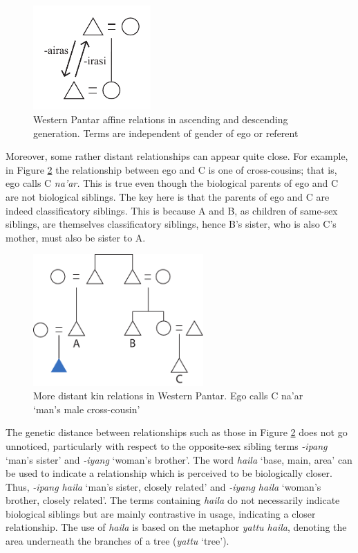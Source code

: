 \begin{figure}[h]
\centering
\includegraphics[width=4.5cm]{figures/Holton_ch5_fig3.pdf}
\caption{ Western Pantar affine relations in ascending and descending generation. Terms are independent of gender of ego or referent}
\label{fig:5:3}
\end{figure}  

Moreover, some rather distant relationships can appear quite close. For example, in Figure \ref{fig:5:4} the relationship between ego and C is one of cross-cousins; that is, ego calls C \textit{na'ar.} This is true even though the biological parents of ego and C are not biological siblings. The key here is that the parents of ego and C are indeed classificatory siblings. This is because A and B, as children of same-sex siblings, are themselves classificatory siblings, hence B's sister, who is also C's mother, must also be sister to A. 

\begin{figure}[bh]
\centering
\includegraphics[width=6.5cm]{figures/Holton_ch5_fig4.pdf}
\caption{More distant kin relations in Western Pantar. Ego calls C na'ar `man's male cross-cousin'}
\label{fig:5:4}
\end{figure}   

The genetic distance between relationships such as those in Figure \ref{fig:5:4} does not go unnoticed, particularly with respect to the opposite-sex sibling terms \textit{-ipang} `man's sister' and \textit{-iyang} `woman's brother'. The word \textit{haila} `base, main, area' can be used to indicate a relationship which is perceived to be biologically closer. Thus, \textit{-ipang haila} `man's sister, closely related' and \textit{-iyang haila} `woman's brother, closely related'. The terms containing \textit{haila} do not necessarily indicate biological siblings but are mainly contrastive in usage, indicating a closer relationship. The use of \textit{haila} is based on the metaphor \textit{yattu haila}, denoting the area underneath the branches of a tree (\textit{yattu} `tree').

